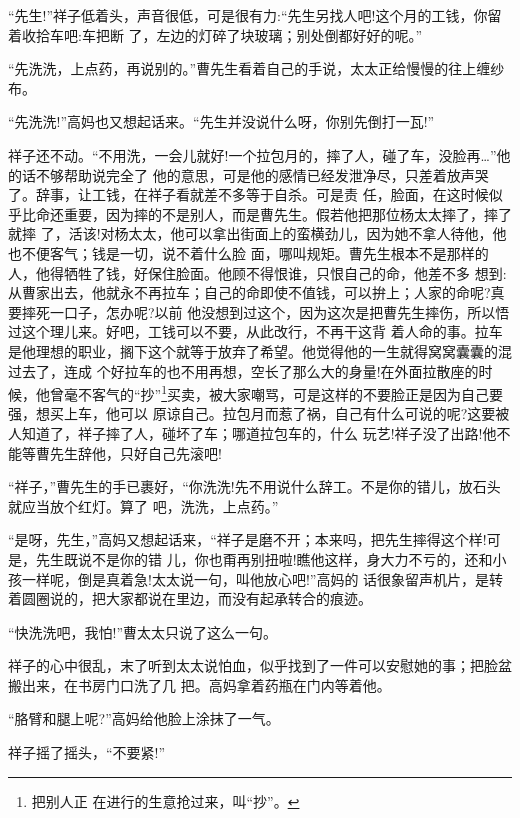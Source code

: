 \documentclass[11pt,a4paper,onecolumn]{article}
\begin{document}
``先生!''祥子低着头，声音很低，可是很有力:``先生另找人吧!这个月的工钱，你留着收拾车吧:车把断
了，左边的灯碎了块玻璃；别处倒都好好的呢。''

``先洗洗，上点药，再说别的。''曹先生看着自己的手说，太太正给慢慢的往上缠纱布。

``先洗洗!''高妈也又想起话来。``先生并没说什么呀，你别先倒打一瓦!''

祥子还不动。``不用洗，一会儿就好!一个拉包月的，摔了人，碰了车，没脸再\ldots ''他的话不够帮助说完全了
他的意思，可是他的感情已经发泄净尽，只差着放声哭了。辞事，让工钱，在祥子看就差不多等于自杀。可是责
任，脸面，在这时候似乎比命还重要，因为摔的不是别人，而是曹先生。假若他把那位杨太太摔了，摔了就摔
了，活该!对杨太太，他可以拿出街面上的蛮横劲儿，因为她不拿人待他，他也不便客气；钱是一切，说不着什么脸
面，哪叫规矩。曹先生根本不是那样的人，他得牺牲了钱，好保住脸面。他顾不得恨谁，只恨自己的命，他差不多
想到:从曹家出去，他就永不再拉车；自己的命即使不值钱，可以拚上；人家的命呢?真要摔死一口子，怎办呢?以前
他没想到过这个，因为这次是把曹先生摔伤，所以悟过这个理儿来。好吧，工钱可以不要，从此改行，不再干这背
着人命的事。拉车是他理想的职业，搁下这个就等于放弃了希望。他觉得他的一生就得窝窝囊囊的混过去了，连成
个好拉车的也不用再想，空长了那么大的身量!在外面拉散座的时候，他曾毫不客气的``抄''\footnote{把别人正
  在进行的生意抢过来，叫``抄''。}买卖，被大家嘲骂，可是这样的不要脸正是因为自己要强，想买上车，他可以
原谅自己。拉包月而惹了祸，自己有什么可说的呢?这要被人知道了，祥子摔了人，碰坏了车；哪道拉包车的，什么
玩艺!祥子没了出路!他不能等曹先生辞他，只好自己先滚吧!

``祥子，''曹先生的手已裹好，``你洗洗!先不用说什么辞工。不是你的错儿，放石头就应当放个红灯。算了
吧，洗洗，上点药。''

``是呀，先生，''高妈又想起话来，``祥子是磨不开；本来吗，把先生摔得这个样!可是，先生既说不是你的错
儿，你也甭再别扭啦!瞧他这样，身大力不亏的，还和小孩一样呢，倒是真着急!太太说一句，叫他放心吧!''高妈的
话很象留声机片，是转着圆圈说的，把大家都说在里边，而没有起承转合的痕迹。

``快洗洗吧，我怕!''曹太太只说了这么一句。

祥子的心中很乱，末了听到太太说怕血，似乎找到了一件可以安慰她的事；把脸盆搬出来，在书房门口洗了几
把。高妈拿着药瓶在门内等着他。

``胳臂和腿上呢?''高妈给他脸上涂抹了一气。

祥子摇了摇头，``不要紧!''
\end{document}
